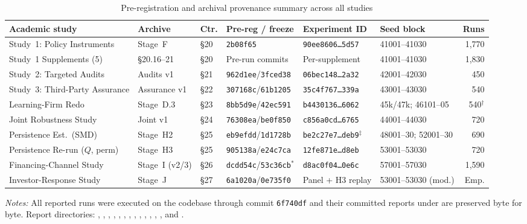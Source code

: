 \documentclass[11pt]{article}
\begin{document}
\begin{table}[h]
\centering
\scriptsize
\begin{threeparttable}
\caption{Pre-registration and archival provenance summary across all studies}
\label{tab:provenance}
\setlength{\tabcolsep}{2.8pt}
\begin{tabular}{@{}>{\raggedright\arraybackslash}p{2.55cm}>{\raggedright\arraybackslash}p{1.2cm}llllr@{}}
\toprule
Academic study & Archive & Ctr. & Pre-reg / freeze & Experiment ID & Seed block & Runs \\
\midrule
Study~1: Policy Instruments & Stage~F & \S20 & \texttt{2b08f65} & \texttt{90ee8606\ldots5d57} & 41001--41030 & 1,770 \\
Study~1 Supplements (5) & \S20.16--21 & \S20 & Pre-run commits & Per-supplement & 41001--41030 & 1,830 \\
Study~2: Targeted Audits & Audits v1 & \S21 & \texttt{962d1ee}/\texttt{3fced38} & \texttt{06bec148\ldots2a32} & 42001--42030 & 450 \\
Study~3: Third-Party Assurance & Assurance v1 & \S22 & \texttt{307168c}/\texttt{61b1205} & \texttt{35c4f767\ldots339a} & 43001--43030 & 540 \\
Learning-Firm Redo & Stage~D.3 & \S23 & \texttt{8bb5d9e}/\texttt{42ec591} & \texttt{b4430136\ldots6062} & 45k/47k; 46101--05 & 540$^\dagger$ \\
Joint Robustness Study & Joint v1 & \S24 & \texttt{76308ea}/\texttt{be0f850} & \texttt{c856a0cd\ldots6765} & 44001--44030 & 720 \\
Persistence Est.\ (SMD) & Stage~H2 & \S25 & \texttt{eb9efdd}/\texttt{1d1728b} & \texttt{be2c27e7\ldots deb9}$^\ddagger$ & 48001--30; 52001--30 & 690 \\
Persistence Re-run ($Q$, perm) & Stage~H3 & \S25 & \texttt{905138a}/\texttt{e24c7ca} & \texttt{12fe871e\ldots d8eb} & 53001--53030 & 720 \\
Financing-Channel Study & Stage~I (v2/3) & \S26 & \texttt{dcdd54c}/\texttt{53c36cb}$^\ast$ & \texttt{d8ac0f04\ldots 0e6c} & 57001--57030 & 1,590 \\
Investor-Response Study & Stage~J & \S27 & \texttt{6a1020a}/\texttt{0e735f0} & Panel + H3 replay & 53001--53030 (mod.) & Emp. \\
\bottomrule
\end{tabular}
\begin{tablenotes}[flushleft]\scriptsize
\item \textit{Notes:} All reported runs were executed on the codebase through commit \texttt{6f740df} and their committed reports under  are preserved byte for byte. Report directories: , , , , , , , , , , , , , and .

\end{tablenotes}
\end{threeparttable}
\end{table}
\end{document}
